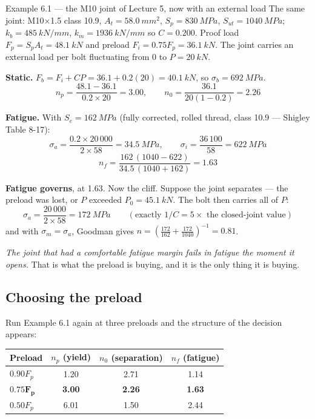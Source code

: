 \documentclass[11pt,a4paper]{article}
\begin{document}
\begin{examplebox}{Example 6.1 --- the M10 joint of Lecture 5, now with an external load}
The same joint: M10$\times$1.5 class 10.9, $A_t=\SI{58.0}{mm^2}$, $S_p=\SI{830}{MPa}$,
$S_{ut}=\SI{1040}{MPa}$; $k_b=\SI{485}{kN/mm}$, $k_m=\SI{1936}{kN/mm}$ so $C=0.200$. Proof load
$F_p=S_pA_t=\SI{48.1}{kN}$ and preload $F_i=0.75F_p=\SI{36.1}{kN}$. The joint carries an external
load per bolt fluctuating from $0$ to $P=\SI{20}{kN}$.

\medskip
\textbf{Static.} $F_b=F_i+CP=36.1+0.2(20)=\SI{40.1}{kN}$, so $\sigma_b=\SI{692}{MPa}$.
\[
n_p=\frac{48.1-36.1}{0.2\times20}=\mathbf{3.00},
\qquad
n_0=\frac{36.1}{20(1-0.2)}=\mathbf{2.26}
\]

\textbf{Fatigue.} With $S_e=\SI{162}{MPa}$ (fully corrected, rolled thread, class 10.9 ---
Shigley Table 8-17):
\[
\sigma_a=\frac{0.2\times20\,000}{2\times58}=\SI{34.5}{MPa},
\qquad
\sigma_i=\frac{36\,100}{58}=\SI{622}{MPa}
\]
\[
n_f=\frac{162\,(1040-622)}{34.5\,(1040+162)}=\mathbf{1.63}
\]

\medskip
\textbf{Fatigue governs}, at 1.63. Now the cliff. Suppose the joint separates --- the preload was
lost, or $P$ exceeded $P_0=\SI{45.1}{kN}$. The bolt then carries all of $P$:
\[
\sigma_a=\frac{20\,000}{2\times58}=\SI{172}{MPa}
\qquad(\text{exactly }1/C=5\times\text{ the closed-joint value})
\]
and with $\sigma_m=\sigma_a$, Goodman gives
$n=\left(\tfrac{172}{162}+\tfrac{172}{1040}\right)^{-1}=\mathbf{0.81}$.

\medskip
\emph{The joint that had a comfortable fatigue margin fails in fatigue the moment it opens.} That
is what the preload is buying, and it is the only thing it is buying.
\end{examplebox}

\subsection{Choosing the preload}

Run Example 6.1 again at three preloads and the structure of the decision appears:

\begin{center}\small
\begin{tabular}{@{}lccc@{}}
\toprule
Preload & $n_p$ (yield) & $n_0$ (separation) & $n_f$ (fatigue)\\
\midrule
$0.90F_p$ & 1.20 & 2.71 & 1.14\\
$\mathbf{0.75F_p}$ & \textbf{3.00} & \textbf{2.26} & \textbf{1.63}\\
$0.50F_p$ & 6.01 & 1.50 & 2.44\\
\bottomrule
\end{tabular}
\end{center}
\end{document}
